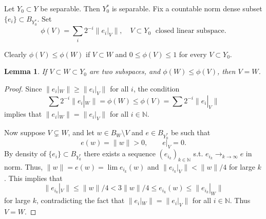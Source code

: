 \documentclass{amsart}
\newtheorem{lemma}[theorem]{Lemma}
\numberwithin{equation}{section}
\newcommand{\N}{\mathbb{N}}
\begin{document}
Let $Y_0 \subset Y$ be separable. Then $Y_0^*$ is separable. Fix a countable norm dense subset $\{e_i\} \subset B_{Y_0^*}$.
Set 
\[
\phi(V) = \sum_i 2^{-i} \| e_i|_V \|,\quad V\subset Y_0\;\mbox{ closed linear subspace}.
\]

Clearly $\phi(V) \le \phi(W)$ if $V \subset W$ and $0\le \phi(V)\le 1$ for every $V\subset Y_0$.

\begin{lemma}\label{lem:phi-distinguishes-subspaces}
If $V \subset W \subset Y_0$ are two subspaces, and $\phi(W) \le \phi(V)$, then $V = W$.
\end{lemma}

\begin{proof}
Since $\| e_i|_W \| \ge \| e_i|_V \|$ for all $i$, the condition
\[
\sum 2^{-i} \| e_i|_W \| = \phi(W) \le \phi(V) = \sum 2^{-i} \| e_i|_V \|
\]
implies that $\| e_i|_W \| = \| e_i|_V \|$ for all $i\in\N$.

Now suppose $V\subsetneq W$, and let $w \in B_W \setminus V$ and $e \in B_{Y_0^*}$ be such that
\[
e(w) = \|w\| > 0,\qquad e|_V = 0.
\]
By density of $\{e_i\}\subset B_{Y^*_0}$ there exists a sequence $(e_{i_k})_{k\in \N}$ s.t. $e_{i_k} \to_{k\to\infty} e$ in norm. Thus, $\|w\|=e(w) = \lim e_{i_k}(w)$ and $\| e_{i_k}|_V \| < \|w\|/4$ for large $k$. This implies that 
\[
\|e_{i_k}|_V\|\le \|w\|/4<3\|w\|/4\le e_{i_k}(w)\le \|e_{i_k}|_W\|
\]
for large $k$, contradicting the fact that $\| e_i|_W \| = \| e_i|_V \|$ for all $i\in\N$. Thus $V = W$.
\end{proof}
\end{document}
